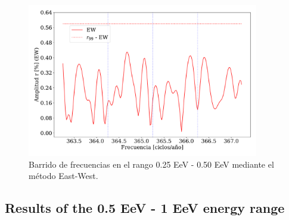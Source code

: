 \documentclass[11pt, letterpaper,oneside]{article}
\begin{document}
\begin{figure}[H]
    \begin{small}
        \begin{center}
            \vspace*{-0.6 cm}
            \includegraphics[width=0.9\textwidth]{Figs/plot_bin_1_barrido_v3_EW.pdf}
            \vspace*{-0.8 cm}
        \end{center}
        \caption{Barrido de frecuencias en el  rango 0.25 EeV - 0.50 EeV mediante el método East-West.}
        \label{fig:primer_barrido}
    \end{small}
\end{figure}

\subsection{Results of the 0.5 EeV - 1 EeV energy range}
\end{document}
